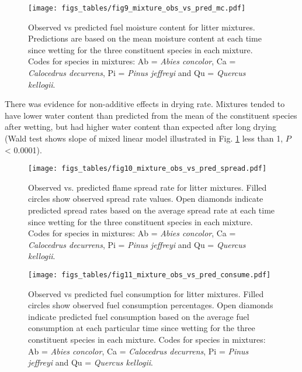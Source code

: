\documentclass[letterpaper,12pt]{article}
\begin{document}


\begin{figure}[h]
  \centering
\texttt{[image: figs\_tables/fig9\_mixture\_obs\_vs\_pred\_mc.pdf]}
\caption{Observed vs predicted fuel moisture content for litter mixtures.
  Predictions are based on the mean moisture content at each time since wetting
  for the three constituent species in each mixture. Codes for species in
  mixtures: Ab = \emph{Abies concolor}, Ca = \emph{Calocedrus decurrens}, Pi =
  \emph{Pinus jeffreyi} and Qu = \emph{Quercus kellogii}.}
  \label{fig:mixture_obs_pred_mc}
\end{figure}

There was evidence for non-additive effects in drying rate. Mixtures tended to
have lower water content than predicted from the mean of the constituent
species after wetting, but had higher water content than expected after long
drying (Wald test shows slope of mixed linear model illustrated in Fig.
\ref{fig:mixture_obs_pred_mc} less than 1, $P$ < 0.0001).


\begin{figure}[h]
  \centering
\texttt{[image: figs\_tables/fig10\_mixture\_obs\_vs\_pred\_spread.pdf]}
\caption{Observed vs. predicted flame spread rate for litter mixtures. Filled
  circles show observed spread rate values. Open diamonds indicate predicted
  spread rates based on the average spread rate at each time since wetting for
  the three constituent species in each mixture. Codes for species in mixtures:
  Ab = \emph{Abies concolor}, Ca = \emph{Calocedrus decurrens}, Pi =
  \emph{Pinus jeffreyi} and Qu = \emph{Quercus kellogii}.}
  \label{fig:mixture_obs_pred_spread}
\end{figure}


\begin{figure}[h]
  \centering
\texttt{[image: figs\_tables/fig11\_mixture\_obs\_vs\_pred\_consume.pdf]}
\caption{Observed vs predicted fuel consumption for litter mixtures. Filled
  circles show observed fuel consumption percentages. Open diamonds indicate
  predicted fuel consumption based on the average fuel consumption at each
  particular time since wetting for the three constituent species in each
  mixture. Codes for species in mixtures: Ab = \emph{Abies concolor}, Ca =
  \emph{Calocedrus decurrens}, Pi = \emph{Pinus jeffreyi} and Qu =
  \emph{Quercus kellogii}.}
  \label{fig:mixture_obs_pred_consume}
\end{figure}
\end{document}
